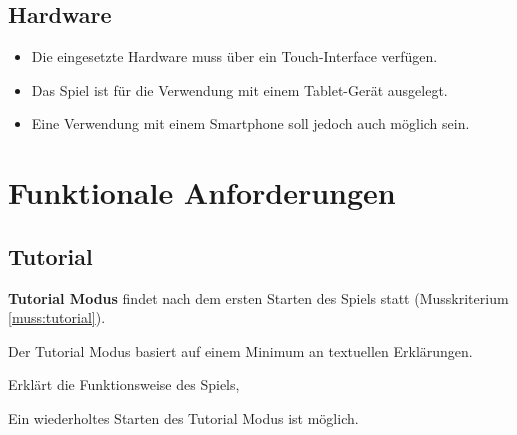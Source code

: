 \documentclass{scrartcl}
\begin{document}
\subsection{Hardware}

\begin{itemize}
	\item Die eingesetzte Hardware muss über ein Touch-Interface verfügen.
	\item Das Spiel ist für die Verwendung mit einem Tablet-Gerät ausgelegt.
	\item Eine Verwendung mit einem Smartphone soll jedoch auch möglich sein.
\end{itemize}

\clearpage









\section{Funktionale Anforderungen}


\subsection{Tutorial} %
\label{sub:fa:tutorial}


\begin{falist}
	\item \label{fa:tutorial} \textbf{Tutorial Modus} findet nach dem ersten Starten des Spiels statt (Musskriterium \ref{muss:tutorial}).
	\begin{falist} 
        \item \label{fa:tutorial_01}Der Tutorial Modus basiert auf einem Minimum an textuellen Erklärungen.
        \item \label{fa:tutorial_02}Erklärt die Funktionsweise des Spiels,
		\item \label{fa:tutorial_03}Ein wiederholtes Starten des Tutorial Modus ist möglich.
	\end{falist}
\end{falist}
\end{document}
